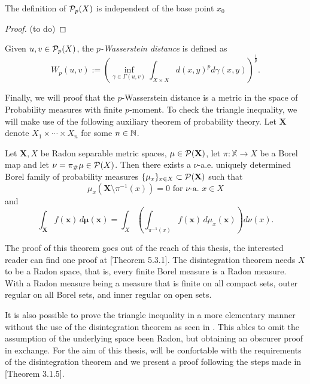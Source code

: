 \begin{proposition}
    The definition of $ \mathcal P_p (X) $ is independent of the base point $ x_0 $
\end{proposition}
\begin{proof}
    (to do)
\end{proof}

\begin{definition}
    Given $ u, v \in \mathcal P_p (X) $, the {\it $p$-Wasserstein distance} is defined as
    $$
        W_p(u, v) := \left( \inf_{\gamma \in \Gamma(u, v)} \int_{X \times X} d(x,y)^p d\gamma(x, y)\right)^{\frac{1}{p}}.
    $$
\end{definition}

Finally, we will proof that the $p$-Wasserstein distance is a metric in the space of Probability measures with finite $p$-moment. To check the triangle inequality, we will make use of the following auxiliary theorem of probability theory. Let $ \mathbf X $ denote $ X_1  \times \cdots \times X_n $ for some $ n \in \mathbb N $.

\begin{theorem}[Disintegration] \label{thm:disintegration}
    Let $ \mathbf X, X $ be Radon separable metric spaces, $ \mathbf \mu \in \mathcal P(\mathbf X) $, let $ \pi: \mathbb X \to X $ be a Borel map and let $ \nu = \pi_\#\mu \in \mathcal P(X) $. Then there exists a $\nu$-a.e. uniquely determined Borel family of probability measures $ \{\mu_x\}_{x \in X} \subset \mathcal P(\mathbf X) $ such that
    $$
        \mu_x(\mathbf X \setminus \pi^{-1}(x)) = 0 \text{ for } \nu \text{-a. } x \in X
    $$
    and
    $$
        \int_{\mathbf X} f(\mathbf x) \, d \mathbf \mu( \mathbf x) = \int_X \left( \int_{\pi^{-1}(x)} f(\mathbf x) \, d\mu_x( \mathbf x) \right) d\nu(x).
    $$
\end{theorem}

The proof of this theorem goes out of the reach of this thesis, the interested reader can find one proof at \cite{ambrosio}[Theorem 5.3.1]. The disintegration theorem needs $ X $ to be a Radon space, that is, every finite Borel measure is a Radon measure. With a Radon measure being a measure that is finite on all compact sets, outer regular on all Borel sets, and inner regular on open sets.

It is also possible to prove the triangle inequality in a more elementary manner without the use of the disintegration theorem as seen in \cite{elementary}. This ables to omit the assumption of the underlying space been Radon, but obtaining an obscurer proof in exchange. For the aim of this thesis, will be confortable with the requirements of the disintegration theorem and we present a proof following the steps made in \cite{Figalli}[Theorem 3.1.5].

